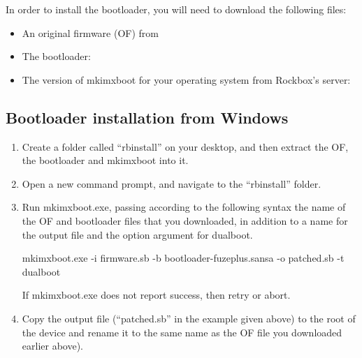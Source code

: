 In order to install the bootloader, you will need to download the following
files:

\begin{itemize}
  \item An original firmware (OF) from %

  \item The bootloader:

  \item The version of mkimxboot for your operating system from Rockbox's server:
\end{itemize}

\subsection{Bootloader installation from Windows}

\begin{enumerate}

\item Create a folder called ``rbinstall'' on your desktop, and then extract
  the OF, the bootloader and mkimxboot into it.

\item Open a new command prompt, and navigate to the ``rbinstall'' folder.

\item Run mkimxboot.exe, passing according to the following syntax the name
  of the OF and bootloader files that you downloaded, in addition to a name for
  the output file and the option argument for dualboot.

  \begin{code}[firstline=\opt{fuzeplus}{1},%
               lastline=\opt{fuzeplus}{1}]
    mkimxboot.exe -i firmware.sb -b bootloader-fuzeplus.sansa -o patched.sb -t dualboot
  \end{code}

  If mkimxboot.exe does not report success, then retry or abort.

  \item Copy the output file (``patched.sb'' in the example given above) to the
    root of the device and rename it to the same name as the OF file you downloaded earlier
      above).

\end{enumerate}

